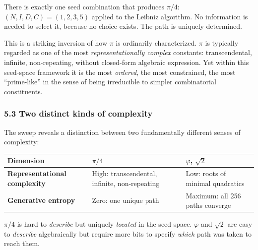 \documentclass[
  11pt,
  letterpaper,
]{article}
\begin{document}
There is exactly one seed combination that produces \(\pi/4\):
\((N, I, D, C) = (1, 2, 3, 5)\) applied to the Leibniz algorithm. No
information is needed to select it, because no choice exists. The path
is uniquely determined.

This is a striking inversion of how \(\pi\) is ordinarily characterized.
\(\pi\) is typically regarded as one of the most
\emph{representationally complex} constants: transcendental, infinite,
non-repeating, without closed-form algebraic expression. Yet within this
seed-space framework it is the most \emph{ordered}, the most
constrained, the most ``prime-like'' in the sense of being irreducible
to simpler combinatorial constituents.

\subsubsection{5.3 Two distinct kinds of
complexity}\label{two-distinct-kinds-of-complexity}

The sweep reveals a distinction between two fundamentally different
senses of complexity:

\begin{longtable}[]{@{}
  >{\raggedright\arraybackslash}p{}
  >{\raggedright\arraybackslash}p{}
  >{\raggedright\arraybackslash}p{}@{}}
\toprule\noalign{}
\begin{minipage}[b]{\linewidth}\raggedright
Dimension
\end{minipage} & \begin{minipage}[b]{\linewidth}\raggedright
\(\pi/4\)
\end{minipage} & \begin{minipage}[b]{\linewidth}\raggedright
\(\varphi\), \(\sqrt{2}\)
\end{minipage} \\
\midrule\noalign{}
\endhead
\bottomrule\noalign{}
\endlastfoot
\textbf{Representational complexity} & High: transcendental, infinite,
non-repeating & Low: roots of minimal quadratics \\
\textbf{Generative entropy} & Zero: one unique path & Maximum: all 256
paths converge \\
\end{longtable}

\(\pi/4\) is hard to \emph{describe} but uniquely \emph{located} in the
seed space. \(\varphi\) and \(\sqrt{2}\) are easy to \emph{describe}
algebraically but require more bits to specify \emph{which} path was
taken to reach them.
\end{document}
